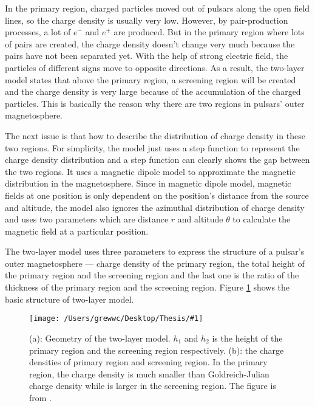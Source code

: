 \documentclass[12pt]{report}
\newcommand{\singleFig}[3]{
  \begin{figure}[!ht]
    \centering
    \texttt{[image: /Users/grewwc/Desktop/Thesis/\#1]}
    \caption{#3}
    \label{fig: #1}
  \end{figure}
}
\begin{document}
        In the primary region, charged particles moved out of pulsars along the open field 
        lines, so the charge density is usually very low. 
        However, by pair-production processes, a lot of $e^{-}$ and $e^{+}$ are produced. 
        But in the primary region where lots of pairs are created, the charge density 
        doesn't change very much because the pairs have not been separated yet. With the help 
        of strong electric field, the particles of different signs move to opposite directions. 
        As a result, the two-layer model states that above the primary region, a screening 
        region will be created and the charge density is very large because of the accumulation 
        of the charged particles. This is basically the reason why there are two regions in 
        pulsars' outer magnetosphere.

        The next issue is that how to describe the distribution of charge density in these two 
        regions. For simplicity, the model just uses a step function to represent the charge 
        density distribution and a step function can clearly shows the gap between the two 
        regions. It uses a magnetic dipole model to approximate the 
        magnetic distribution in the magnetosphere. Since in magnetic dipole model, magnetic 
        fields at one position is only dependent on the position's distance from the source 
        and altitude, the model also ignores the azimuthal distribution of charge density 
        and uses two parameters which are distance $r$ and altitude $\theta$ to calculate the 
        magnetic field at a particular position.

        The two-layer model uses three parameters to express the structure of a pulsar's outer 
        magnetosphere --- charge density of the primary region, the total height of the primary 
        region and the screening region and the last one is the ratio of the thickness of the 
        primary region and the screening region. Figure \ref{fig: charge_density} shows the 
        basic structure of two-layer model. 

        \singleFig{charge_density}{0.6}{(a): Geometry of the two-layer model. $h_{1}$ and 
          $h_{2}$ is the height of the primary region and the screening region respectively. 
          (b): the charge densities of primary region and screening region. In the primary 
          region, the charge density is much smaller than Goldreich-Julian charge density
          while is larger in the screening region. The figure is from 
          \cite{0004-637X-720-1-178}.}
\end{document}
